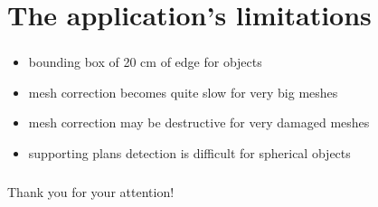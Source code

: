 \documentclass{beamer}
\begin{document}

\section{The application's limitations}
\begin{frame}
	\frametitle{}
	\begin{block}{}
    \begin{itemize}
    \item bounding box of 20 cm of edge for objects
    \item mesh correction becomes quite slow for very big meshes
    \item mesh correction may be destructive for very damaged meshes
    \item supporting plans detection is difficult for spherical objects 
    \end{itemize}
    \end{block}
\end{frame}

\begin{frame}
	\frametitle{}

    \begin{center}
    \Large{Thank you for your attention!}
    \end{center}
\end{frame}
	
\end{document}
